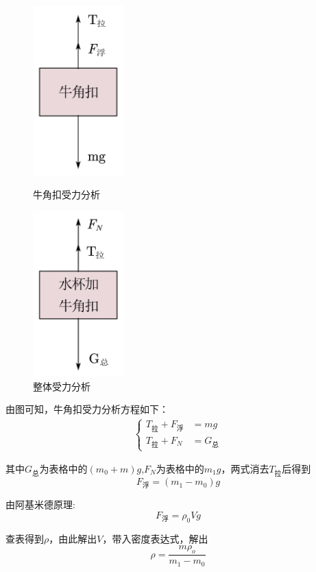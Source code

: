 \documentclass[12pt,a4paper,UTF8]{ctexart}
\begin{document}
\begin{figure}[!htbp]
	\centering
	\begin{minipage}[t]{0.4\textwidth}
		\centering
		\includegraphics[width=3.5cm]{牛角扣受力分析.png}
		\caption{牛角扣受力分析}
	\end{minipage}
	\begin{minipage}[t]{0.4\textwidth}
		\centering
		\includegraphics[width=3.5cm]{水和烧杯受力分析.png}
		\caption{整体受力分析}
	\end{minipage}
\end{figure}
\par 由图可知，牛角扣受力分析方程如下：
\begin{align*}
    \left\{
        \begin{aligned}
            T_{\text{拉}}+F_{\text{浮}}&=mg\\
            T_{\text{拉}}+F_{N}&=G_{\text{总}}
        \end{aligned}
    \right.
\end{align*}
\par 其中$G_{\text{总}}$为表格中的$(m_0+m)g$,$F_N$为表格中的$m_1g$，两式消去$T_{\text{拉}}$后得到
\[
	F_{\text{浮}} = (m_1-m_0)g
\]
\par 由阿基米德原理:
\[
	F_{\text{浮}} = \rho_0 V g
\]
\par 查表得到$\rho$，由此解出$V$，带入密度表达式，解出
\[
	\rho = \frac{m \rho_o}{m_1-m_0}
\]
\end{document}
